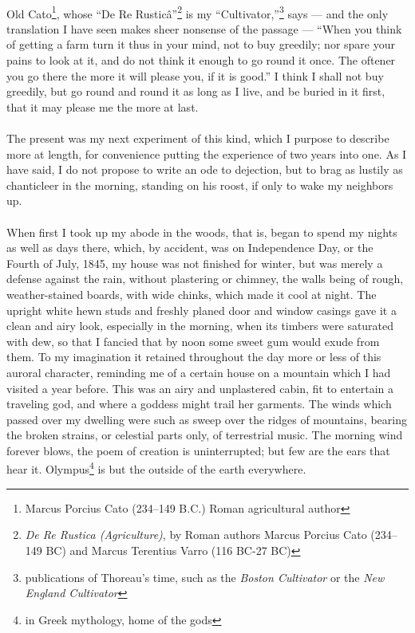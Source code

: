 \documentclass[letterpaper,12pt]{article}
\begin{document}
\paragraph{} Old Cato\footnote{Marcus Porcius Cato (234--149 B.C.) Roman
    agricultural author}, whose \enquote{De Re Rustic\^a}\footnote{\textit{De Re
        Rustica (Agriculture)}, by Roman authors Marcus Porcius Cato (234--149
    BC) and Marcus Terentius Varro (116 BC-27 BC)} is my
\enquote{Cultivator,}\footnote{publications of Thoreau's time, such as the
    \textit{Boston Cultivator} or the \textit{New England Cultivator}} says ---
and the only translation I have seen makes sheer nonsense of the passage ---
\enquote{When you think of getting a farm turn it thus in your mind, not to buy
    greedily; nor spare your pains to look at it, and do not think it enough to
    go round it once. The oftener you go there the more it will please you, if
    it is good.} I think I shall not buy greedily, but go round and round it as
long as I live, and be buried in it first, that it may please me the more at
last.


\paragraph{} The present was my next experiment of this kind, which I purpose to
describe more at length, for convenience putting the experience of two years
into one. As I have said, I do not propose to write an ode to dejection, but to
brag as lustily as chanticleer in the morning, standing on his roost, if only to
wake my neighbors up.


\paragraph{} When first I took up my abode in the woods, that is, began to spend
my nights as well as days there, which, by accident, was on Independence Day, or
the Fourth of July, 1845, my house was not finished for winter, but was merely
a defense against the rain, without plastering or chimney, the walls being of
rough, weather-stained boards, with wide chinks, which made it cool at night.
The upright white hewn studs and freshly planed door and window casings gave it
a clean and airy look, especially in the morning, when its timbers were
saturated with dew, so that I fancied that by noon some sweet gum would exude
from them. To my imagination it retained throughout the day more or less of this
auroral character, reminding me of a certain house on a mountain which I had
visited a year before. This was an airy and unplastered cabin, fit to entertain
a traveling god, and where a goddess might trail her garments. The winds which
passed over my dwelling were such as sweep over the ridges of mountains, bearing
the broken strains, or celestial parts only, of terrestrial music. The morning
wind forever blows, the poem of creation is uninterrupted; but few are the ears
that hear it. Olympus\footnote{in Greek mythology, home of the gods} is but the
outside of the earth everywhere.
\end{document}
